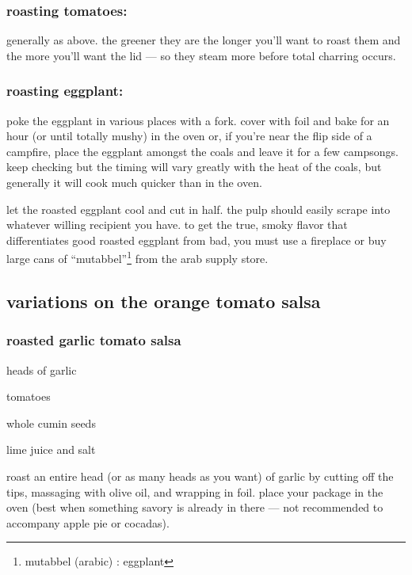 \subsubsection{roasting tomatoes:}
generally as above. the greener they are the longer you'll want to roast them 
and the more you'll want the lid --- so they steam more before total charring 
occurs.

\subsubsection{roasting eggplant:}
poke the eggplant in various places with a fork. cover with foil and bake for 
an hour (or until totally mushy) in the oven or, if you're near the flip side 
of a campfire, place the eggplant amongst the coals and leave it for a few 
campsongs. keep checking but the timing will vary greatly with the heat of the 
coals, but generally it will cook much quicker than in the oven.

let the roasted eggplant cool and cut in half. the pulp should easily scrape 
into whatever willing recipient you have. to get the true, smoky flavor that 
differentiates good roasted eggplant from bad, you must use a fireplace or buy 
large cans of ``mutabbel''\footnote{mutabbel (arabic) : eggplant} from the 
arab supply store.

\subsection{variations on the orange tomato salsa}

\subsubsection{roasted garlic tomato salsa}

\begin{ingredients}
  \item heads of garlic
  \item tomatoes
  \item whole cumin seeds
  \item lime juice and salt
\end{ingredients}

roast an entire head (or as many heads as you want) of garlic by cutting off 
the tips, massaging with olive oil, and wrapping in foil. place your package 
in the oven (best when something savory is already in there --- not 
recommended to accompany apple pie or cocadas).


